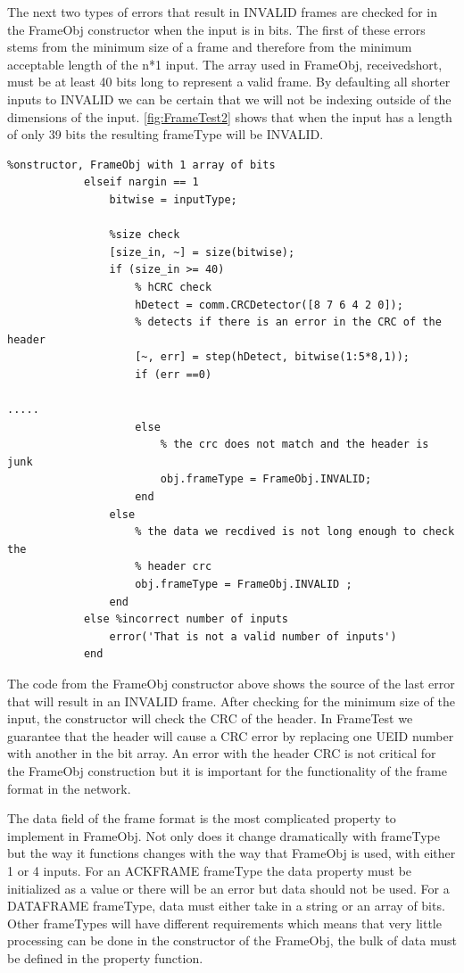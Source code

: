 The next two types of errors that result in INVALID frames are checked for in the FrameObj constructor when the input is in bits. The first of these errors stems from the minimum size of a frame and therefore from the minimum acceptable length of the n*1 input. The array used in FrameObj, receivedshort,  must be at least 40 bits long to represent a valid frame. By defaulting all shorter inputs to INVALID we can be certain that we will not be indexing outside of the dimensions of the input. \ref{fig:FrameTest2} shows that when the input has a length of only 39 bits the resulting frameType will be INVALID. 

\begin{lstlisting} 
%onstructor, FrameObj with 1 array of bits
            elseif nargin == 1
                bitwise = inputType;
                 
                %size check
                [size_in, ~] = size(bitwise);
                if (size_in >= 40)
                    % hCRC check
                    hDetect = comm.CRCDetector([8 7 6 4 2 0]);
                    % detects if there is an error in the CRC of the header
                    [~, err] = step(hDetect, bitwise(1:5*8,1));
                    if (err ==0)
																						.....
                    else
                        % the crc does not match and the header is junk
                        obj.frameType = FrameObj.INVALID;
                    end
                else
                    % the data we recdived is not long enough to check the
                    % header crc
                    obj.frameType = FrameObj.INVALID ;     
                end
            else %incorrect number of inputs
                error('That is not a valid number of inputs')
            end
\end{lstlisting} 

The code from the FrameObj constructor above shows the source of the last error that will result in an INVALID frame. After checking for the minimum size of the input, the constructor will check the CRC of the header. In FrameTest we guarantee that the header will cause a CRC error by replacing one UEID number with another in the bit array. An error with the header CRC is not critical for the FrameObj construction but it is important for the functionality of the frame format in the network.

The data field of the frame format is the most complicated property to implement in FrameObj. Not only does it change dramatically with frameType but the way it functions changes with the way that FrameObj is used, with either 1 or 4 inputs. For an ACKFRAME frameType the data property must be initialized as a value or there will be an error but data should not be used. For a DATAFRAME frameType, data must either take in a string or an array of bits. Other frameTypes will have different requirements which means that very little processing can be done in the constructor of the FrameObj, the bulk of data must be defined in the property function. 

